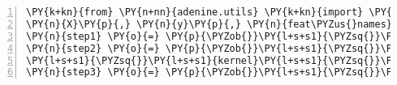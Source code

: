 \begin{Verbatim}[commandchars=\\\{\},numbers=left,firstnumber=1,stepnumber=1]
\PY{k+kn}{from} \PY{n+nn}{adenine.utils} \PY{k+kn}{import} \PY{n}{data\PYZus{}source}
\PY{n}{X}\PY{p}{,} \PY{n}{y}\PY{p}{,} \PY{n}{feat\PYZus{}names}\PY{p}{,} \PY{n}{class\PYZus{}names} \PY{o}{=} \PY{n}{data\PYZus{}source}\PY{o}{.}\PY{n}{load}\PY{p}{(}\PY{l+s+s1}{\PYZsq{}}\PY{l+s+s1}{circles}\PY{l+s+s1}{\PYZsq{}}\PY{p}{)}
\PY{n}{step1} \PY{o}{=} \PY{p}{\PYZob{}}\PY{l+s+s1}{\PYZsq{}}\PY{l+s+s1}{None}\PY{l+s+s1}{\PYZsq{}}\PY{p}{:} \PY{p}{[}\PY{n+nb+bp}{True}\PY{p}{]}\PY{p}{\PYZcb{}} \PY{c+c1}{\PYZsh{} Preprocessing}
\PY{n}{step2} \PY{o}{=} \PY{p}{\PYZob{}}\PY{l+s+s1}{\PYZsq{}}\PY{l+s+s1}{KernelPCA}\PY{l+s+s1}{\PYZsq{}}\PY{p}{:} \PY{p}{[}\PY{n+nb+bp}{True}\PY{p}{,} \PY{p}{\PYZob{}}\PY{l+s+s1}{\PYZsq{}}\PY{l+s+s1}{n\PYZus{}components}\PY{l+s+s1}{\PYZsq{}}\PY{p}{:} \PY{l+m+mi}{2}\PY{p}{,}
\PY{l+s+s1}{\PYZsq{}}\PY{l+s+s1}{kernel}\PY{l+s+s1}{\PYZsq{}}\PY{p}{:} \PY{p}{[}\PY{l+s+s1}{\PYZsq{}}\PY{l+s+s1}{linear}\PY{l+s+s1}{\PYZsq{}}\PY{p}{,}\PY{l+s+s1}{\PYZsq{}}\PY{l+s+s1}{rbf}\PY{l+s+s1}{\PYZsq{}}\PY{p}{]}\PY{p}{,} \PY{l+s+s1}{\PYZsq{}}\PY{l+s+s1}{gamma}\PY{l+s+s1}{\PYZsq{}}\PY{p}{:} \PY{l+m+mi}{2}\PY{p}{\PYZcb{}}\PY{p}{]}\PY{p}{\PYZcb{}} \PY{c+c1}{\PYZsh{} Dimensionality reduction}
\PY{n}{step3} \PY{o}{=} \PY{p}{\PYZob{}}\PY{l+s+s1}{\PYZsq{}}\PY{l+s+s1}{KMeans}\PY{l+s+s1}{\PYZsq{}}\PY{p}{:} \PY{p}{[}\PY{n+nb+bp}{True}\PY{p}{,} \PY{p}{\PYZob{}}\PY{l+s+s1}{\PYZsq{}}\PY{l+s+s1}{n\PYZus{}clusters}\PY{l+s+s1}{\PYZsq{}}\PY{p}{:} \PY{p}{[}\PY{l+m+mi}{2}\PY{p}{]}\PY{p}{\PYZcb{}}\PY{p}{]}\PY{p}{\PYZcb{}} \PY{c+c1}{\PYZsh{} Clustering}
\end{Verbatim}
